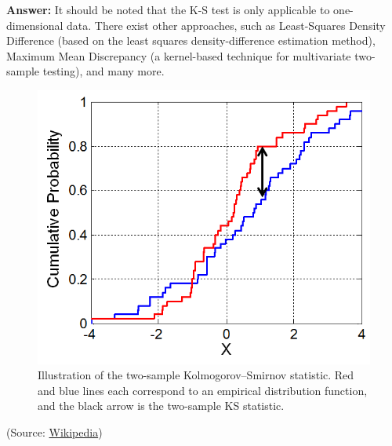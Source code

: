 \documentclass{article}
\newenvironment{QandA}{\begin{enumerate}[label=\arabic*.]}{\end{enumerate}}
\newenvironment{answer}{\par\normalfont \textbf{Answer:}}{}
\begin{document}
\begin{QandA}
\begin{answer}
        It should be noted that the K-S test is only applicable to one-dimensional data. There exist other approaches, such as Least-Squares Density Difference (based on the least squares density-difference estimation method), Maximum Mean Discrepancy (a kernel-based technique for multivariate two-sample testing), and many more.
        
        \begin{figure}[htb!]
            \centering
            \includegraphics[width=0.4\columnwidth]{img/ks.png}
            \caption{Illustration of the two-sample Kolmogorov–Smirnov statistic. Red and blue lines each correspond to an empirical distribution function, and the black arrow is the two-sample KS statistic.}
            \label{fig:ks}
        \end{figure}
        (Source: \href{https://en.wikipedia.org/wiki/Kolmogorov%E2%80%93Smirnov_test}{Wikipedia})
    \end{answer}


\end{QandA}
\end{document}
